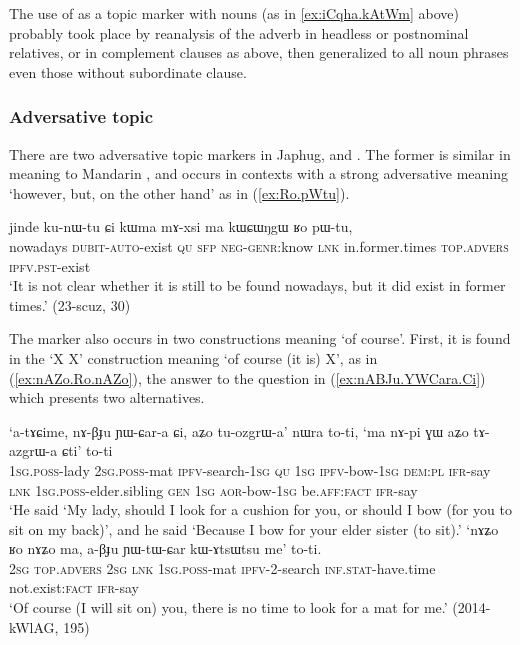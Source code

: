 The use of  as a topic marker with nouns (as in \ref{ex:iCqha.kAtWm} above) probably took place by reanalysis of the adverb in headless or postnominal relatives, or in complement clauses as above, then generalized to all noun phrases even those without subordinate clause.

 \subsubsection{Adversative topic} \label{sec:adversative.topic}
There are two adversative topic markers in Japhug,  and . The former is similar in meaning to Mandarin , and occurs in contexts with a strong adversative meaning `however, but, on the other hand' as in (\ref{ex:Ro.pWtu}).

\begin{exe}
\ex \label{ex:Ro.pWtu}
\gll jinde ku-nɯ-tu ɕi kɯma mɤ-xsi ma kɯɕɯŋgɯ ʁo pɯ-tu, \\
nowadays \textsc{dubit}-\textsc{auto}-exist \textsc{qu} \textsc{sfp} \textsc{neg}-\textsc{genr}:know \textsc{lnk} in.former.times \textsc{top}.\textsc{advers} \textsc{ipfv}.\textsc{pst}-exist \\
\glt `It is not clear whether it is still to be found nowadays, but it did exist in former times.' (23-scuz, 30)
\end{exe}

The marker  also occurs in two constructions meaning `of course'. First, it is found in the `X  X' construction meaning `of course (it is)  X', as in (\ref{ex:nAZo.Ro.nAZo}), the answer to the question in (\ref{ex:nABJu.YWCara.Ci}) which presents two alternatives.

\begin{exe}
\ex
\begin{xlist}
\ex  \label{ex:nABJu.YWCara.Ci}
\gll `a-tɤɕime, nɤ-βɟu ɲɯ-ɕar-a ɕi, aʑo tu-ozgrɯ-a' nɯra to-ti, `ma nɤ-pi ɣɯ aʑo tɤ-azgrɯ-a ɕti' to-ti  \\
\textsc{1sg}.\textsc{poss}-lady \textsc{2sg}.\textsc{poss}-mat \textsc{ipfv}-search-\textsc{1sg} \textsc{qu} \textsc{1sg} \textsc{ipfv}-bow-\textsc{1sg} \textsc{dem}:\textsc{pl} \textsc{ifr}-say \textsc{lnk} \textsc{1sg}.\textsc{poss}-elder.sibling \textsc{gen} \textsc{1sg} \textsc{aor}-bow-\textsc{1sg} be.\textsc{aff}:\textsc{fact} \textsc{ifr}-say \\
\glt `He said `My lady, should I look for a cushion for you, or should I bow (for you to sit on my back)', and he said  `Because I bow for your elder sister (to sit).'
\ex  \label{ex:nAZo.Ro.nAZo}
\gll  `nɤʑo ʁo nɤʑo ma, a-βɟu ɲɯ-tɯ-ɕar kɯ-ɤtsɯtsu me' to-ti.   \\
\textsc{2sg} \textsc{top}.\textsc{advers} \textsc{2sg} \textsc{lnk} \textsc{1sg}.\textsc{poss}-mat \textsc{ipfv}-2-search \textsc{inf}.\textsc{stat}-have.time  not.exist:\textsc{fact} \textsc{ifr}-say \\
\glt  `Of course (I will sit on) you, there is no time to look for a mat for me.' (2014-kWlAG, 195)
\end{xlist}
\end{exe}

